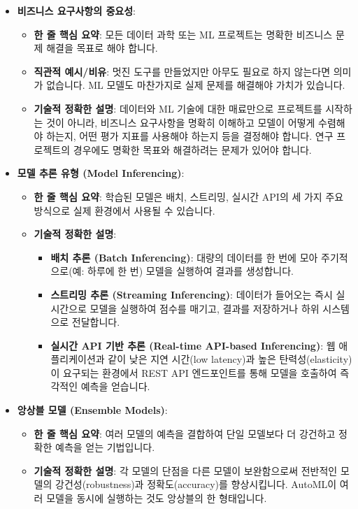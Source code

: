 \documentclass[11pt,a4paper]{article}
\begin{document}
\begin{itemize}
    \item \textbf{비즈니스 요구사항의 중요성}:
    \begin{itemize}
        \item \textbf{한 줄 핵심 요약}: 모든 데이터 과학 또는 ML 프로젝트는 명확한 비즈니스 문제 해결을 목표로 해야 합니다.
        \item \textbf{직관적 예시/비유}: 멋진 도구를 만들었지만 아무도 필요로 하지 않는다면 의미가 없습니다. ML 모델도 마찬가지로 실제 문제를 해결해야 가치가 있습니다.
        \item \textbf{기술적 정확한 설명}: 데이터와 ML 기술에 대한 매료만으로 프로젝트를 시작하는 것이 아니라, 비즈니스 요구사항을 명확히 이해하고 모델이 어떻게 수렴해야 하는지, 어떤 평가 지표를 사용해야 하는지 등을 결정해야 합니다. 연구 프로젝트의 경우에도 명확한 목표와 해결하려는 문제가 있어야 합니다.
    \end{itemize}

    \item \textbf{모델 추론 유형 (Model Inferencing)}:
    \begin{itemize}
        \item \textbf{한 줄 핵심 요약}: 학습된 모델은 배치, 스트리밍, 실시간 API의 세 가지 주요 방식으로 실제 환경에서 사용될 수 있습니다.
        \item \textbf{기술적 정확한 설명}:
        \begin{itemize}
            \item \textbf{배치 추론 (Batch Inferencing)}: 대량의 데이터를 한 번에 모아 주기적으로(예: 하루에 한 번) 모델을 실행하여 결과를 생성합니다.
            \item \textbf{스트리밍 추론 (Streaming Inferencing)}: 데이터가 들어오는 즉시 실시간으로 모델을 실행하여 점수를 매기고, 결과를 저장하거나 하위 시스템으로 전달합니다.
            \item \textbf{실시간 API 기반 추론 (Real-time API-based Inferencing)}: 웹 애플리케이션과 같이 낮은 지연 시간(low latency)과 높은 탄력성(elasticity)이 요구되는 환경에서 REST API 엔드포인트를 통해 모델을 호출하여 즉각적인 예측을 얻습니다.
        \end{itemize}
    \end{itemize}

    \item \textbf{앙상블 모델 (Ensemble Models)}:
    \begin{itemize}
        \item \textbf{한 줄 핵심 요약}: 여러 모델의 예측을 결합하여 단일 모델보다 더 강건하고 정확한 예측을 얻는 기법입니다.
        \item \textbf{기술적 정확한 설명}: 각 모델의 단점을 다른 모델이 보완함으로써 전반적인 모델의 강건성(robustness)과 정확도(accuracy)를 향상시킵니다. AutoML이 여러 모델을 동시에 실행하는 것도 앙상블의 한 형태입니다.
    \end{itemize}


\end{itemize}
\end{document}
